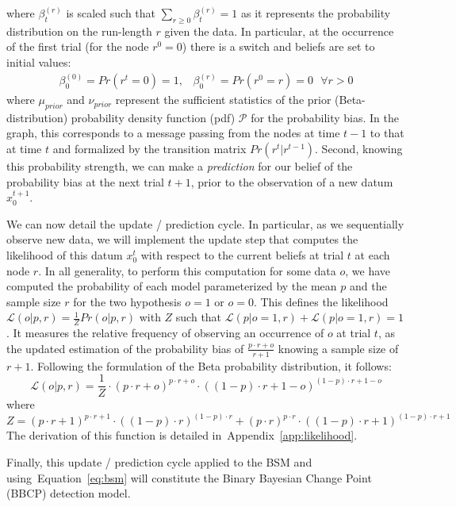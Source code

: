 \documentclass[12pt,english]{article}%
\newcommand{\eq}[1]{\begin{equation*}#1\end{equation*}}
\newcommand{\eql}[1]{\begin{equation}#1\end{equation}}
\newcommand{\eqa}[1]{\begin{align}#1\end{align}}
\newcommand{\Ll}{\mathcal{L}}
\newcommand{\Pp}{\mathcal{P}}
\newcommand{\seeEq}[1]{Equation~\ref{eq:#1}}
\newcommand{\seeApp}[1]{Appendix~\ref{app:#1}}
\begin{document}
where $\beta^{(r)}_t$ is scaled such that $\sum_{r \geq 0 } \beta^{(r)}_t = 1$
as it represents the probability distribution on the run-length $r$ given the data.
In particular, at the occurrence of the first trial (for the node $r^0=0$)
there is a switch and beliefs are set to initial values:
\eqa{
\beta^{(0)}_0=Pr(r^t=0)=1 \text{,}\quad \beta^{(r)}_0=Pr(r^0=r)=0 \text{ } \forall r>0
}
where $\mu_{prior}$ and $\nu_{prior}$ represent the sufficient statistics
of the prior (Beta-distribution) probability density function (pdf) $\Pp$
for the probability bias.
In the graph, this corresponds to a message passing from the nodes at time $t-1$
to that at time $t$ and formalized by the transition matrix $Pr(r^t | r^{t-1})$.
Second, knowing this probability strength, %
we can make a \emph{prediction} for our belief of the probability bias at the next trial $t+1$,
prior to the observation of a new datum $x_0^{t+1}$.

We can now detail the update / prediction cycle.
In particular, as we sequentially observe new data,
we will  implement the update step that
computes the likelihood of this datum $x_0^t$ with respect to
the current beliefs at trial $t$ at each node $r$.
In all generality, to perform this computation for some data $o$,
we have computed the probability of each model
parameterized by the mean $p$ and the sample size $r$
for the two hypothesis $o=1$ or $o=0$.
This defines the likelihood
$\Ll(o | p, r) = \frac{1}{Z} Pr(o |p, r)$
with $Z$ such that $\Ll(p | o=1, r) + \Ll(p | o=1, r)=1$.
It measures the relative frequency of observing an occurrence of $o$ at trial $t$,
as the updated estimation of the probability bias of $\frac{p\cdot r + o}{r+1}$
knowing a sample size of $r+1$.
Following the formulation of the Beta probability distribution, it follows:
\eql{%
\Ll(o | p, r) = \frac{1}{Z} \cdot {(p\cdot r + o)}^{p\cdot r + o} \cdot {((1- p)\cdot r + 1- o)}^{(1- p)\cdot r + 1- o}
\label{eq:likelihood}
}
where
\eq{
Z = {(p\cdot r + 1)}^{p\cdot r + 1}  \cdot {((1- p)\cdot r )}^{(1- p)\cdot r }  +
    {(p\cdot r )}^{p\cdot r }  \cdot {((1- p)\cdot r + 1)}^{(1- p)\cdot r + 1}
}
The derivation of this function is detailed in~\seeApp{likelihood}.

Finally, this update / prediction cycle applied to the BSM and using~\seeEq{bsm}
will constitute the Binary Bayesian Change Point (BBCP) detection model.
\end{document}
